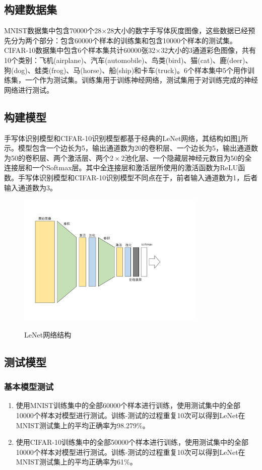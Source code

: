 \documentclass[a4paper]{ctexart}
\begin{document}
\begin{spacing}{1.3}
\subsection{构建数据集}
MNIST数据集中包含70000个28$\times$28大小的数字手写体灰度图像，这些数据已经预先分为两个部分：包含60000个样本的训练集和包含10000个样本的测试集。CIFAR-10数据集中包含6个样本集共计60000张32$\times$32大小的3通道彩色图像，共有10个类别：飞机(airplane)、汽车(automobile)、鸟类(bird)、猫(cat)、鹿(deer)、狗(dog)、蛙类(frog)、马(horse)、船(ship)和卡车(truck)。6个样本集中5个用作训练集，一个作为测试集。训练集用于训练神经网络，测试集用于对训练完成的神经网络进行测试。

\subsection{构建模型}
手写体识别模型和CIFAR-10识别模型都基于经典的LeNet网络\cite{RN138}，其结构如图\ref{figure:LeNet}所示。模型包含一个边长为5，输出通道数为20的卷积层、一个边长为5，输出通道数为50的卷积层、两个激活层、两个$2\times 2$池化层、一个隐藏层神经元数目为50的全连接层和一个Softmax层。其中全连接层和激活层所使用的激活函数为ReLU函数。手写体识别模型和CIFAR-10识别模型不同点在于，前者输入通道数为1，后者输入通道数为3。
\begin{figure}[htbp]
	\centering
	\includegraphics[width=0.8\textwidth, keepaspectratio]{figure/LeNet.pdf}\\
	\caption{LeNet网络结构}\label{figure:LeNet}
\end{figure}

\subsection{测试模型}
\subsubsection{基本模型测试}\label{sec:基本测试}
\begin{enumerate}[itemindent=2em,label=(\arabic*)]
	\item 使用MNIST训练集中的全部60000个样本进行训练，使用测试集中的全部10000个样本对模型进行测试。训练-测试的过程重复10次可以得到LeNet在MNIST测试集上的平均正确率为98.279\%。
	\item 使用CIFAR-10训练集中的全部50000个样本进行训练，使用测试集中的全部10000个样本对模型进行测试。训练-测试的过程重复10次可以得到LeNet在MNIST测试集上的平均正确率为61\%。
\end{enumerate}



\end{spacing}
\end{document}

